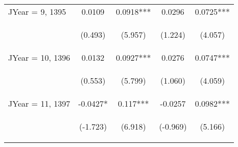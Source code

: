 \documentclass[]{article}
\begin{document}
\begin{center}
\begin{tabular}{lcccc}
        JYear = 9, 1395  & 0.0109                                          & 0.0918***                                      & 0.0296                                         & 0.0725***                                      \\
        \vspace{4pt}     & \begin{footnotesize}(0.493)\end{footnotesize}   & \begin{footnotesize}(5.957)\end{footnotesize}  & \begin{footnotesize}(1.224)\end{footnotesize}  & \begin{footnotesize}(4.057)\end{footnotesize}  \\
        JYear = 10, 1396 & 0.0132                                          & 0.0927***                                      & 0.0276                                         & 0.0747***                                      \\
        \vspace{4pt}     & \begin{footnotesize}(0.553)\end{footnotesize}   & \begin{footnotesize}(5.799)\end{footnotesize}  & \begin{footnotesize}(1.060)\end{footnotesize}  & \begin{footnotesize}(4.059)\end{footnotesize}  \\
        JYear = 11, 1397 & -0.0427*                                        & 0.117***                                       & -0.0257                                        & 0.0982***                                      \\
        \vspace{4pt}     & \begin{footnotesize}(-1.723)\end{footnotesize}  & \begin{footnotesize}(6.918)\end{footnotesize}  & \begin{footnotesize}(-0.969)\end{footnotesize} & \begin{footnotesize}(5.166)\end{footnotesize}  \\

\end{tabular}
\end{center}
\end{document}
